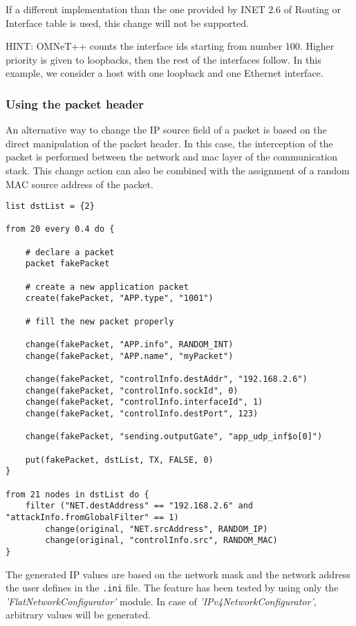 If a different implementation than the one provided by INET 2.6 of Routing or Interface table is used, this change will not be supported.

HINT: OMNeT++ counts the interface ids starting from number 100. Higher priority is given to loopbacks, then the rest of the interfaces follow. In this example, we consider a host with one loopback and one Ethernet interface.

\subsubsection{Using the packet header}
An alternative way to change the IP source field of a packet is based on the direct manipulation of the packet header. In this case, the interception of the packet is performed between the network and mac layer of the communication stack. This change action can also be combined with the assignment of a random MAC source address of the packet. 

\begin{lstlisting}[language={asl}, caption={Assign random IP source address on packet header}]
list dstList = {2}

from 20 every 0.4 do {

	# declare a packet
	packet fakePacket
    
	# create a new application packet
	create(fakePacket, "APP.type", "1001") 

	# fill the new packet properly
	
	change(fakePacket, "APP.info", RANDOM_INT)
	change(fakePacket, "APP.name", "myPacket")
	
	change(fakePacket, "controlInfo.destAddr", "192.168.2.6")
	change(fakePacket, "controlInfo.sockId", 0)
	change(fakePacket, "controlInfo.interfaceId", 1)
	change(fakePacket, "controlInfo.destPort", 123)
	
	change(fakePacket, "sending.outputGate", "app_udp_inf$o[0]")
	
	put(fakePacket, dstList, TX, FALSE, 0)
} 

from 21 nodes in dstList do {
	filter ("NET.destAddress" == "192.168.2.6" and "attackInfo.fromGlobalFilter" == 1)
		change(original, "NET.srcAddress", RANDOM_IP)
		change(original, "controlInfo.src", RANDOM_MAC)
}
\end{lstlisting}

The generated IP values are based on the network mask and the network address the user defines in the \texttt{.ini} file. The feature has been tested by using only the \emph{'FlatNetworkConfigurator'} module. In case of \emph{'IPv4NetworkConfigurator'}, arbitrary values will be generated.